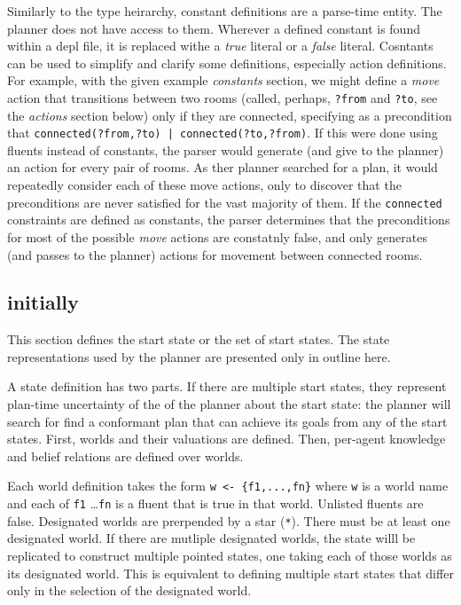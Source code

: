 \documentclass{article}
\begin{document}
Similarly to the type heirarchy, constant definitions are a parse-time entity.
The planner does not have access to them.
Wherever a defined constant is found within a depl file, it is replaced withe a
\emph{true} literal or a
\emph{false} literal.  Cosntants can be used to simplify and clarify some definitions,
especially action definitions. For example, with the given example
\emph{constants} section, we might define a \emph{move} action that transitions
between two rooms (called, perhaps, \verb|?from| and \verb|?to|, see the
\emph{actions} section below) only if they are connected, specifying as a
precondition that \verb"connected(?from,?to) | connected(?to,?from)".  If this
were done using fluents instead of constants,
the parser would generate (and give to the planner) an
action for every pair of rooms. As ther planner searched for a plan, it
would repeatedly consider each of these move actions, only to discover that the
preconditions are never satisfied for the vast majority of them. If
the \verb|connected| constraints are defined as constants, the parser determines that
the preconditions for most of the possible \emph{move} actions are constatnly
false, and only generates (and passes to the planner) actions for movement
between connected rooms.



\subsection{initially}

This section defines the start state or the set of start states.
The state representations used by the planner are presented only in outline
here.

A state definition has two parts.
If there are multiple start states, they represent
plan-time uncertainty of the of the planner about the start state: the planner
will search for find a conformant plan that can achieve its goals from any of
the start states.
First, worlds and their valuations are
defined. Then, per-agent knowledge and belief relations are defined over worlds.

Each world definition takes the form
\verb|w <- {f1,...,fn}|
where \verb|w| is a world name
and each of \verb|f1| \ldots \verb|fn| is a fluent 
that is true in that world. Unlisted fluents are false.
Designated worlds are prerpended by a star (\verb|*|).
There must be at least one designated world. 
If there are mutliple designated worlds, the state willl be replicated to
construct multiple pointed states, one taking each of those worlds as its
designated world. This is equivalent to defining multiple start states that
differ only in the selection of the designated world.
\end{document}
